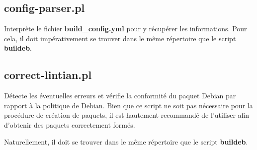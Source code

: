 \documentclass[12pt,a4paper]{article}
\begin{document}
\subsection{config-parser.pl}
Interprète le fichier \textbf{build\_config.yml} pour y récupérer les informations. Pour cela, il doit impérativement se trouver dans le même répertoire que le script \textbf{buildeb}.
\subsection{correct-lintian.pl}
Détecte les éventuelles erreurs et vérifie la conformité du paquet Debian par rapport à la politique de Debian. Bien que ce script ne soit pas nécessaire pour la procédure de création de paquets, il est hautement recommandé de l'utiliser afin d'obtenir des paquets correctement formés.

Naturellement, il doit se trouver dans le même répertoire que le script \textbf{buildeb}.
\end{document}
